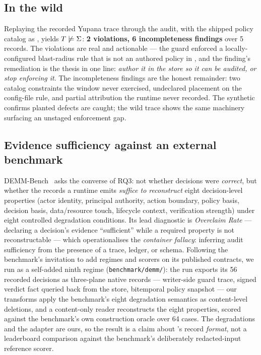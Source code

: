 \subsection{In the wild}
\label{sec:eval-wild}
Replaying the recorded Yupana trace through the audit, with the shipped
policy catalog as \Sig, yields $T \not\models \Sigma$: \textbf{2
violations, 6 incompleteness findings} over 5 records. The violations
are real and actionable --- the guard enforced a locally-configured
blast-radius rule that is not an authored policy in \Sig, and the
finding's remediation is the thesis in one line: \emph{author it in
the store so it can be audited, or stop enforcing it}. The
incompleteness findings are the honest remainder: two catalog
constraints the window never exercised, undeclared placement on the
config-file rule, and partial attribution the runtime never recorded.
The synthetic \census confirms planted defects are caught; the wild
trace shows the same machinery surfacing an unstaged enforcement gap.

\subsection{Evidence sufficiency against an external benchmark}
\label{sec:eval-demm}
DEMM-Bench~\cite{solozobov2026demmbench} asks the converse of RQ3: not
whether decisions were \emph{correct}, but whether the records a
runtime emits \emph{suffice to reconstruct} eight decision-level
properties (actor identity, principal authority, action boundary,
policy basis, decision basis, data/resource touch, lifecycle context,
verification strength) under eight controlled degradation conditions.
Its lead diagnostic is \emph{Overclaim Rate} --- declaring a decision's
evidence ``sufficient'' while a required property is not
reconstructable --- which operationalises the \emph{container fallacy}:
inferring audit sufficiency from the presence of a trace, ledger, or
schema. Following the benchmark's invitation to add regimes and
scorers on its published contracts, we run \sys as a self-added ninth
regime (\texttt{benchmark/demm/}): the \census run exports its 56
recorded decisions as three-plane native records --- writer-side guard
trace, signed verdict fact queried back from the store, bitemporal
policy snapshot --- our transforms apply the benchmark's eight
degradation semantics as content-level deletions, and a content-only
reader reconstructs the eight properties, scored against the
benchmark's own construction oracle over 64 cases. The degradations
and the adapter are ours, so the result is a claim about \sys's
record \emph{format}, not a leaderboard comparison against the
benchmark's deliberately redacted-input reference scorer.

